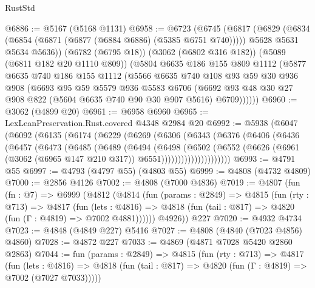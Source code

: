 \begin{lexlean}{RustStd}
\begin{coremodule}
@6886 := @5167 (@5168 @1131)
@6958 := @6723
    (@6745
      (@6817
        (@6829
          (@6834 (@6854 (@6871 (@6877 (@6884 @6886) (@5385 @6751 @740)))))
          @5628
          @5631
          @5634
          @5636))
      (@6782 (@6795 @18))
      (@3062 (@6802 @316 @182))
      (@5089 (@6811 @182 @20 @1110 @809))
      (@5804
        @6635
        @186
        @155
        @809
        @1112
        (@5877
          @6635
          @740
          @186
          @155
          @1112
          (@5566
            @6635
            @740
            @108
            @93
            @59
            @30
            @936
            @908
            (@6693
              @95
              @59
              @5579
              @936
              @5583
              @6706
              (@6692 @93 @48 @30 @27 @908 @822 (@5604 @6635 @740 @90 @30 @907 @5616) @6709))))))
@6960 := @3062 (@4899 @20)
@6961 := @6958 @6960
@6965 := LexLeanPreservation.Rust.covered @4348 @2984 @20
@6992 := @5938
    (@6047
      (@6092
        (@6135
          (@6174
            (@6229
              (@6269
                (@6306
                  (@6343
                    (@6376
                      (@6406
                        (@6436
                          (@6457
                            (@6473
                              (@6485
                                (@6489
                                  (@6494
                                    (@6498
                                      (@6502
                                        (@6552
                                          (@6626
                                            (@6961
                                              (@3062 (@6965 @147 @210 @317))
                                              @6551)))))))))))))))))))))
@6993 := @4791 @55
@6997 := @4793 (@4797 @55) (@4803 @55)
@6999 := @4808 (@4732 @4809)
@7000 := @2856 @4126
@7002 := @4808 (@7000 @4836)
@7019 := @4807
    (fun (fn : @7) =>
    @6999
      (@4812
        (@4814
          (fun (params : @2849) =>
          @4815
            (fun (rty : @713) =>
            @4817
              (fun (lets : @4816) =>
              @4818 (fun (tail : @817) => @4820 (fun (Γ : @4819) => @7002 @4881))))))
        @4926))
    @227
@7020 := @4932 @4734
@7023 := @4848 (@4849 @227) @5416
@7027 := @4808 (@4840 (@7023 @4856) @4860)
@7028 := @4872 @227
@7033 := @4869 (@4871 @7028 @5420 @2860 @2863)
@7044 := fun (params : @2849) =>
  @4815
    (fun (rty : @713) =>
    @4817
      (fun (lets : @4816) =>
      @4818 (fun (tail : @817) => @4820 (fun (Γ : @4819) => @7002 (@7027 @7033)))))

\end{coremodule}
\end{lexlean}
